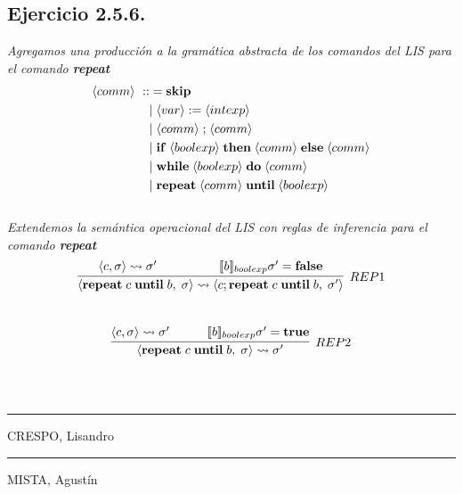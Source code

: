 \documentclass[a4paper,10pt]{article}
\begin{document}
\subsection*{Ejercicio 2.5.6.}
	\emph{Agregamos una producción a la gramática abstracta de los comandos del LIS para el comando {\bf repeat}}
	\\
	\begin{alignat*}{3}
		\langle comm \rangle\ ::&= {\bf skip} \\
			&|\;\langle var  \rangle  \;{:=}\;\langle intexp \rangle\\
			&|\;\langle comm \rangle  \;{;}\;\langle comm \rangle\\
			&|\;{\bf if}\;\langle boolexp \rangle\;{\bf then}\;\langle comm \rangle\;{\bf else}\;\langle comm \rangle\\
			&|\;{\bf while}\;\langle boolexp \rangle\;{\bf do}\;\langle comm \rangle\\
			&|\;{\bf repeat}\;\langle comm \rangle\;{\bf until}\;\langle boolexp \rangle
	\end{alignat*}
\pagebreak
	\\
	\emph{Extendemos la semántica operacional del LIS con reglas de inferencia para el comando {\bf repeat}}
	\\
	\begin{align*}
		\infer[REP1]{
			\langle {\bf repeat}\; c\;{\bf until}\; b,\;\sigma\rangle \rightsquigarrow \langle c; {\bf repeat}\; c\;{\bf until}\; b,\;\sigma'\rangle
		}{
			\langle c, \sigma\rangle \rightsquigarrow \sigma'
			\qquad & \qquad 
			[\![b]\!]_{boolexp}\sigma' = {\bf false} 
		}
	\end{align*}
	\\
	\begin{align*}
		\infer[REP2]{
			\langle {\bf repeat}\; c\;{\bf until}\; b,\;\sigma\rangle \rightsquigarrow \sigma'
		}{
			\langle c, \sigma\rangle \rightsquigarrow \sigma'
			\quad & \quad  
			[\![b]\!]_{boolexp}\sigma' = {\bf true} 
		}
	\end{align*}
	\\ 
\pagebreak
\\
\vspace{\fill}
\begin{multicols}{2}
	\hrule
	\vspace{5pt}
	CRESPO, Lisandro \\
	\linebreak

	\hrule
	\vspace{5pt}
	MISTA, Agustín \\
\end{multicols}
\end{document}
